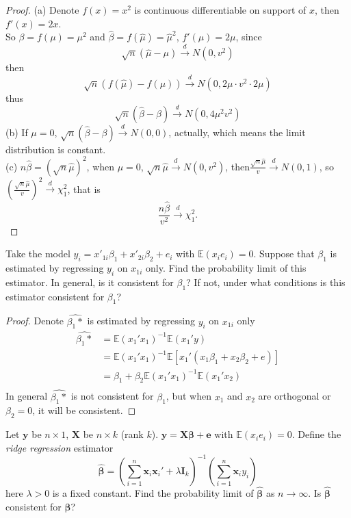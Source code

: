 \documentclass[12pt]{article}
\newenvironment{question}[2][Question]{\begin{trivlist}
\item[\hskip \labelsep {\bmseries #1}\hskip \labelsep {\bmseries #2.}]}{\end{trivlist}}
\begin{document}
\begin{proof}
(a) Denote $f(x) = x^2$ is continuous differentiable on support of $x$, then $f'(x) = 2x$.\\
So $\beta = f(\mu) = \mu^2$ and $\hat{\beta} = f(\hat{\mu}) = \hat{\mu}^2$, $f'(\mu) = 2\mu$, since
$$\sqrt{n}(\hat{\mu}-\mu)\xrightarrow{d}N(0,v^2)$$
then
$$\sqrt{n}(f(\hat{\mu})-f(\mu))\xrightarrow{d}N(0,2\mu\cdot v^2 \cdot 2\mu)$$
thus
$$\sqrt{n}(\hat{\beta}-\beta)\xrightarrow{d}N(0,4\mu^2v^2)$$
(b) If $\mu = 0$, 
$\sqrt{n}(\hat{\beta}-\beta)\xrightarrow{d}N(0,0)$, actually, which means the limit distribution is constant.\\
(c) $n\hat{\beta} = (\sqrt{n}\hat{\mu})^2$, when $\mu = 0$, $\sqrt{n}\hat{\mu}\xrightarrow{d}N(0,v^2)$, then$\frac{\sqrt{n}\hat{\mu}}{v}\xrightarrow{d}N(0,1)$, so $(\frac{\sqrt{n}\hat{\mu}}{v})^2\xrightarrow{d}\chi_1^2$, that is $$\frac{n\hat{\beta}}{v^2}\xrightarrow{d}\chi_1^2.$$
\end{proof}

\begin{question}{7.1}
Take the model $y_i = x'_{1i}\beta_1 + x'_{2i}\beta_2+e_i$ with $\mathbb{E}(x_ie_i) = 0$. Suppose that $\beta_1$ is estimated by regressing $y_i$ on $x_{1i}$ only. Find the probability limit of this estimator. In general, is it consistent for $\beta_1$? If not, under what conditions is this estimator consistent for $\beta_1$?
\end{question}

\begin{proof}
Denote $\hat{\beta_1*}$ is estimated by regressing $y_i$ on $x_{1i}$ only
\begin{align*}
\hat{\beta_1*} & = \mathbb{E}(x_1'x_1)^{-1}\mathbb{E}(x_1'y)\\
&= \mathbb{E}(x_1'x_1)^{-1}\mathbb{E}[x_1'(x_1\beta_1+x_2\beta_2+e)]\\
&= \beta_1 +\beta_2\mathbb{E}(x_1'x_1)^{-1}\mathbb{E}(x_1'x_2)\\
\end{align*}
In general $\hat{\beta_1*}$ is not consistent for $\beta_1$, but when $x_1$ and $x_2$ are orthogonal or $\beta_2 = 0$, it will be consistent.
\end{proof}

\begin{question}{7.2}
Let $\bm{y}$ be $n\times 1$, $\bm{X}$ be $n \times k$ (rank $k$). $\bm{y = X\beta +e}$ with $\mathbb{E}(x_i e_i)=0$. Define the \textit{ridge regression} estimator
$$\hat{\bm{\beta}} = (\sum_{i = 1}^{n}\bm{x}_i\bm{x}_i'+\lambda\bm{I}_k)^{-1}(\sum_{i = 1}^n\bm{x}_i y_i)$$
here $\lambda > 0$ is a fixed constant. Find the probability limit of $\bm{\hat{\beta}}$ as $n\to \infty$. Is $\hat{\bm{\beta}}$ consistent for $\bm{\beta}$?
\end{question}
\end{document}
